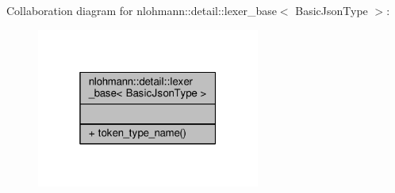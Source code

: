 Collaboration diagram for nlohmann\+:\+:detail\+:\+:lexer\+\_\+base$<$ Basic\+Json\+Type $>$\+:
\nopagebreak
\begin{figure}[H]
\begin{center}
\leavevmode
\includegraphics[width=208pt]{classnlohmann_1_1detail_1_1lexer__base__coll__graph}
\end{center}
\end{figure}
